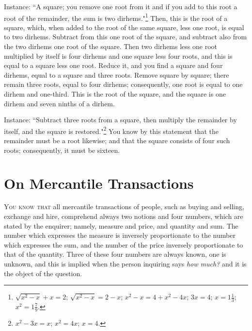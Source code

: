 Instance: ``A square; you remove one root from it and if you add to this root a root of the remainder, the sum is two dirhems."\footnote{$\sqrt{x^2 - x} + x = 2$; $\sqrt{x^2 - x} = 2 - x$; $x^2 - x = 4 + x^2 - 4x$; $3x = 4$; $x = 1\frac{1}{3}$; $x^2 = 1\frac{7}{9}$.} Then, this is the root of a square, which, when added to the root of the same square, less one root, is equal to two dirhems. Subtract from this one root of the square, and subtract also from the two dirhems one root of the square. Then two dirhems less one root multiplied by itself is four dirhems and one square less four roots, and this is equal to a square less one root. Reduce it, and you find a square and four dirhems, equal to a square and three roots. Remove square by square; there remain three roots, equal to four dirhems; consequently, one root is equal to one dirhem and one-third. This is the root of the square, and the square is one dirhem and seven ninths of a dirhem.

Instance: ``Subtract three roots from a square, then multiply the remainder by itself, and the square is restored."\footnote{$x^2 - 3x = x$; $x^2 = 4x$; $x = 4$.} You know by this statement that the remainder must be a root likewise; and that the square consists of four such roots; consequently, it must be sixteen.

\clearpage

\section*{On Mercantile Transactions}

\lettrine{Y}{ou know that} all mercantile transactions of people, such as buying and selling, exchange and hire, comprehend always two notions and four numbers, which are stated by the enquirer; namely, measure and price, and quantity and sum. The number which expresses the measure is inversely proportionate to the number which expresses the sum, and the number of the price inversely proportionate to that of the quantity. Three of these four numbers are always known, one is unknown, and this is implied when the person inquiring says \textit{how much?} and it is the object of the question.

